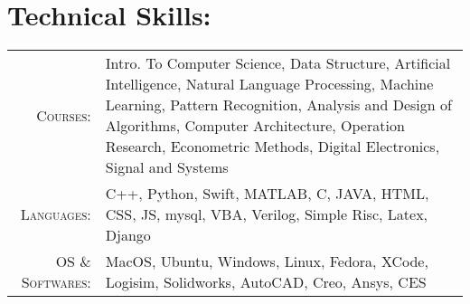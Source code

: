 \documentclass[a4paper,10pt]{article}
\begin{document}
\section{Technical Skills:}
\begin{tabular}{r|p{15cm}}
 \textsc{Courses:}&Intro. To Computer Science, Data Structure, Artificial Intelligence, Natural Language Processing, Machine Learning, Pattern Recognition, Analysis and Design of Algorithms, Computer Architecture, Operation Research, Econometric Methods, Digital Electronics, Signal and Systems\\
\textsc{Languages:}&C++, Python, Swift, MATLAB, C, JAVA, HTML, CSS, JS, mysql, VBA, Verilog, Simple Risc, Latex, Django\\
\textsc{OS \& Softwares:}&MacOS, Ubuntu, Windows, Linux, Fedora, XCode, Logisim, Solidworks, AutoCAD, Creo, Ansys, CES\\
\end{tabular}


\end{document}
